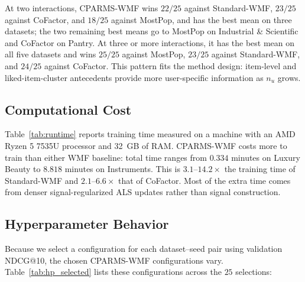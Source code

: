 \documentclass[pdflatex,sn-vancouver-num]{sn-jnl}%
\theoremstyle{thmstyleone}%
\theoremstyle{thmstyletwo}%
\theoremstyle{thmstylethree}%
\begin{document}
At two interactions, CPARMS-WMF wins $22/25$ against Standard-WMF, $23/25$ against CoFactor, and $18/25$ against MostPop, and has the best mean on three datasets; the two remaining best means go to MostPop on Industrial \& Scientific and CoFactor on Pantry. At three or more interactions, it has the best mean on all five datasets and wins $25/25$ against MostPop, $23/25$ against Standard-WMF, and $24/25$ against CoFactor. This pattern fits the method design: item-level and liked-item-cluster antecedents provide more user-specific information as $n_u$ grows.

\subsection{Computational Cost}

Table~\ref{tab:runtime} reports training time measured on a machine with an AMD Ryzen 5 7535U processor and 32~GB of RAM. CPARMS-WMF costs more to train than either WMF baseline: total time ranges from $0.334$ minutes on Luxury Beauty to $8.818$ minutes on Instruments. This is $3.1$--$14.2\times$ the training time of Standard-WMF and $2.1$--$6.6\times$ that of CoFactor. Most of the extra time comes from denser signal-regularized ALS updates rather than signal construction.

\subsection{Hyperparameter Behavior}

Because we select a configuration for each dataset--seed pair using validation NDCG@10, the chosen CPARMS-WMF configurations vary. Table~\ref{tab:hp_selected} lists these configurations across the $25$ selections:
\end{document}
